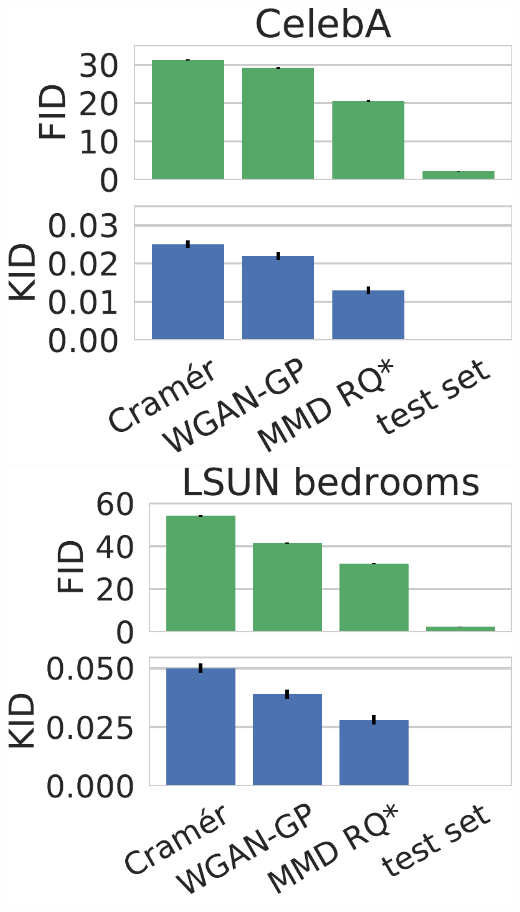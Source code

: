 \documentclass[xcolor={table}]{beamer}
\begin{document}
\begin{frame}{}
\begin{columns}[T, totalwidth=\textwidth]
\begin{column}{.32\textwidth}
    \includegraphics[width=.48\linewidth]{figs/celeba-scores.pdf}
    \hfill
    \includegraphics[width=.48\linewidth]{figs/lsun-scores.pdf}

  \end{column}


\end{columns}
\end{frame}
\end{document}
